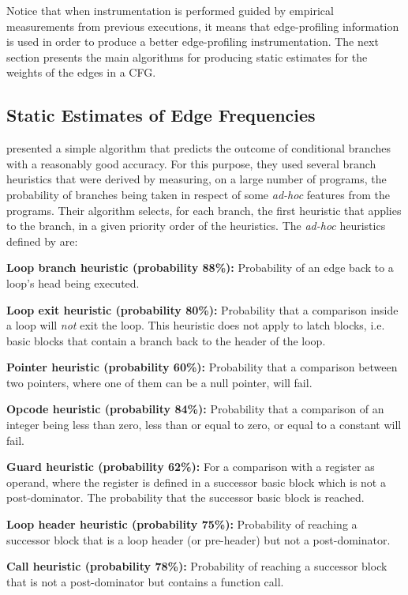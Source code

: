 Notice that when instrumentation is performed guided by empirical measurements from previous executions, it means that edge-profiling information is used in order to produce a better edge-profiling instrumentation.
The next section presents the main algorithms for producing static estimates for the weights of the edges in a CFG.

\subsection{Static Estimates of Edge Frequencies}

\cite{ball93} presented a simple algorithm that predicts the outcome of conditional branches with a reasonably good accuracy.
For this purpose, they used several branch heuristics that were derived by measuring, on a large number of programs, the probability of branches being taken in respect of some \textit{ad-hoc} features from the programs.
Their algorithm selects, for each branch, the first heuristic that applies to the branch, in a given priority order of the heuristics.
The \textit{ad-hoc} heuristics defined by \cite{ball93} are:

\noindent\textbf{Loop branch heuristic (probability 88\%):} Probability of an edge back to a loop's head being executed.

\noindent\textbf{Loop exit heuristic (probability 80\%):} Probability that a comparison inside a loop will \textit{not} exit the loop. This heuristic does not apply to latch blocks, i.e. basic blocks that contain a branch back to the header of the loop.

\noindent\textbf{Pointer heuristic (probability 60\%):} Probability that a comparison between two pointers, where one of them can be a null pointer, will fail.

\noindent\textbf{Opcode heuristic (probability 84\%):} Probability that a comparison of an integer being less than zero, less than or equal to zero, or equal to a constant will fail.

\noindent\textbf{Guard heuristic (probability 62\%):} For a comparison with a register as operand, where the register is defined in a successor basic block which is not a post-dominator. The probability that the successor basic block is reached.

\noindent\textbf{Loop header heuristic (probability 75\%):} Probability of reaching a successor block that is a loop header (or pre-header) but not a post-dominator.

\noindent\textbf{Call heuristic (probability 78\%):} Probability of reaching a successor block that is not a post-dominator but contains a function call.

